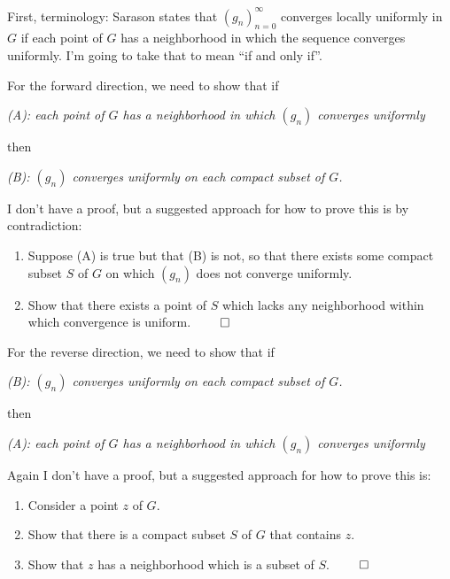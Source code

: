 \documentclass[12pt]{article}
\begin{document}
\begin{description}

  \\\\
  First, terminology: Sarason states that $(g_n)_{n=0}^\infty$ converges
  locally uniformly in $G$ if each point of $G$ has a neighborhood in which the
  sequence converges uniformly. I'm going to take that to mean ``if and only if''.

  For the forward direction, we need to show that if

  \emph{(A): each point of $G$ has a neighborhood in which $(g_n)$ converges uniformly}

  then

  \emph{(B): $(g_n)$ converges uniformly on each compact subset of $G$.}

  I don't have a proof, but a suggested approach for how to prove this is by contradiction:
  \begin{enumerate}
  \item Suppose (A) is true but that (B) is not, so that there exists some
    compact subset $S$ of $G$ on which $(g_n)$ does not converge uniformly.
  \item Show that there exists a point of $S$ which lacks any neighborhood
    within which convergence is uniform. $\qed$
  \end{enumerate}

  For the reverse direction, we need to show that if

  \emph{(B): $(g_n)$ converges uniformly on each compact subset of $G$.}

  then

  \emph{(A): each point of $G$ has a neighborhood in which $(g_n)$ converges uniformly}

  Again I don't have a proof, but a suggested approach for how to prove this is:
  \begin{enumerate}
  \item Consider a point $z$ of $G$.
  \item Show that there is a compact subset $S$ of $G$ that contains $z$.
  \item Show that $z$ has a neighborhood which is a subset of $S$. $\qed$
  \end{enumerate}



\end{description}
\end{document}
